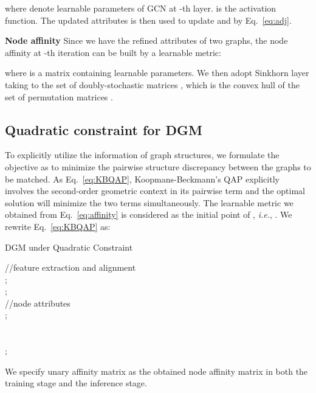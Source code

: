 \documentclass[final]{cvpr}
\begin{document}
where  denote learnable parameters of GCN at -th layer.  is the activation function. The updated attributes  is then used to update  and  by Eq.~\eqref{eq:adj}.


{\bf{Node affinity} }
Since we have the refined attributes of two graphs, the node affinity  at -th iteration can be built by a learnable metric:

where  is a matrix containing learnable parameters. We then adopt Sinkhorn layer taking  to the set of doubly-stochastic matrices , which is the convex hull of the set of permutation matrices .

\subsection{Quadratic constraint for DGM}
To explicitly utilize the information of graph structures, we formulate the objective as to minimize the pairwise structure discrepancy between the graphs to be matched. As Eq.~\eqref{eq:KBQAP}, Koopmans-Beckmann’s QAP explicitly involves the second-order geometric context in its pairwise term and the optimal solution will minimize the two terms simultaneously. The learnable metric  we obtained from Eq.~\eqref{eq:affinity} is considered as the initial point of , {\em i.e.}, . We rewrite Eq.~\eqref{eq:KBQAP} as:

\begin{algorithm}[t!]
\label{alg1}
\caption{DGM under Quadratic Constraint}

    //feature extraction and alignment\\
    ;\\
    ;\\
    //node attributes\\
      ;\\
    \\
    \\
      ;\\
\end{algorithm}
We specify unary affinity matrix  as the obtained node affinity matrix  in both the training stage and the inference stage.
\end{document}

